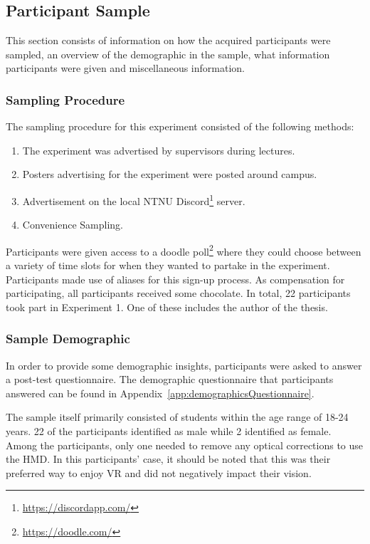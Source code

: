 \subsection{Participant Sample}
This section consists of information on how the acquired participants were sampled, an overview of the demographic in the sample, what information participants were given and miscellaneous information. 

\subsubsection{Sampling Procedure}
The sampling procedure for this experiment consisted of the following methods:

\begin{enumerate}
    \item The experiment was advertised by supervisors during lectures.
    \item Posters advertising for the experiment were posted around campus.
    \item Advertisement on the local NTNU Discord\footnote{\url{https://discordapp.com/}} server.
    \item Convenience Sampling.
\end{enumerate}

Participants were given access to a doodle poll\footnote{\url{https://doodle.com/}} where they could choose between a variety of time slots for when they wanted to partake in the experiment. Participants made use of aliases for this sign-up process. As compensation for participating, all participants received some chocolate. In total, 22 participants took part in Experiment 1. One of these includes the author of the thesis. 

\subsubsection{Sample Demographic}
In order to provide some demographic insights, participants were asked to answer a post-test questionnaire. The demographic questionnaire that participants answered can be found in Appendix~\ref{app:demographicsQuestionnaire}.

The sample itself primarily consisted of students within the age range of 18-24 years. 22 of the participants identified as male while 2 identified as female. Among the participants, only one needed to remove any optical corrections to use the HMD. In this participants' case, it should be noted that this was their preferred way to enjoy VR and did not negatively impact their vision. 

